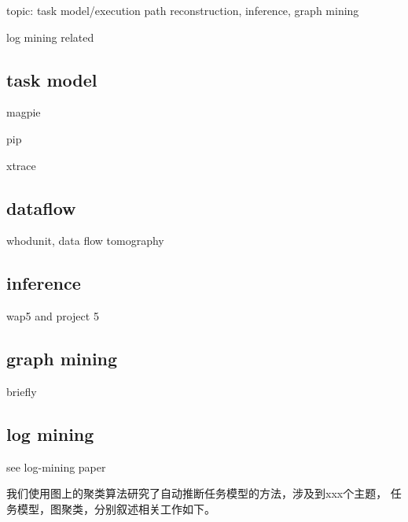 topic: task model/execution path reconstruction, inference, graph
mining

log mining related

\subsection{task model}

magpie

pip

xtrace

\subsection{dataflow}

whodunit, data flow tomography

\subsection{inference}

wap5 and project 5

\subsection{graph mining}

briefly

\subsection{log mining}

see log-mining paper

我们使用图上的聚类算法研究了自动推断任务模型的方法，涉及到xxx个主题，
任务模型，图聚类，分别叙述相关工作如下。
